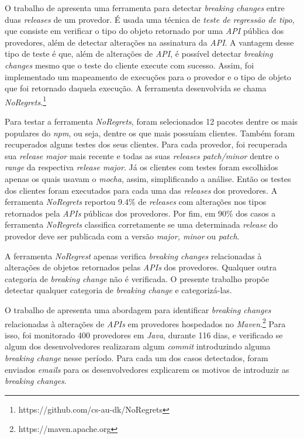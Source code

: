 O trabalho de  apresenta uma ferramenta para detectar \textit{breaking changes} entre duas \textit{releases} de um provedor. É usada uma técnica de \textit{teste de regressão de tipo}, que consiste em verificar o tipo do objeto retornado por uma \textit{API} pública dos provedores, além de detectar alterações na assinatura da \textit{API}. A vantagem desse tipo de teste é que, além de alterações de \textit{API}, é possível detectar \textit{breaking changes} mesmo que o teste do cliente execute com sucesso. Assim, foi implementado um mapeamento de execuções para o provedor e o tipo de objeto que foi retornado daquela execução. A ferramenta desenvolvida se chama \textit{NoRegrets}.\footnote{https://github.com/cs-au-dk/NoRegrets}

Para testar a ferramenta \textit{NoRegrets}, foram selecionados 12 pacotes dentre os mais populares do \textit{npm}, ou seja, dentre os que mais possuíam clientes. Também foram recuperados alguns testes dos seus clientes. Para cada provedor, foi recuperada sua \textit{release major} mais recente e todas as suas \textit{releases patch/minor} dentre o \textit{range} da respectiva \textit{release major}. Já os clientes com testes foram escolhidos apenas os quais usavam o \textit{mocha}, assim, simplificando a análise. Então os testes dos clientes foram executados para cada uma das \textit{releases} dos provedores. A ferramenta \textit{NoRegrets} reportou 9.4\% de \textit{releases} com alterações nos tipos retornados pela \textit{APIs} públicas dos provedores. Por fim, em 90\% dos casos a ferramenta \textit{NoRegrets} classifica corretamente se uma determinada \textit{release} do provedor deve ser publicada com a versão \textit{major, minor} ou \textit{patch}.

A ferramenta \textit{NoRegrest} apenas verifica \textit{breaking changes} relacionadas à alterações de objetos retornados pelas \textit{APIs} dos provedores. Qualquer outra categoria de \textit{breaking change} não é verificada. O presente trabalho propõe detectar qualquer categoria de \textit{breaking change} e categorizá-las.

O trabalho de  apresenta uma abordagem para identificar \textit{breaking changes} relacionadas à alterações de \textit{APIs} em provedores hospedados no \textit{Maven}.\footnote{https://maven.apache.org} Para isso, foi monitorado 400 provedores em \textit{Java}, durante 116 dias, e verificado se algum dos desenvolvedores realizaram algum \textit{commit} introduzindo alguma \textit{breaking change} nesse período.  Para cada um dos casos detectados, foram enviados \textit{emails} para os desenvolvedores explicarem os motivos de introduzir as \textit{breaking changes}.


